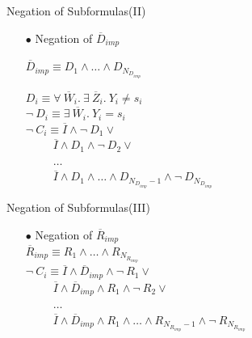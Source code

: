 \documentclass[pdf,slideColor,contemporain]{prosper}
\begin{document}
\begin{slide}{Negation of Subformulas(II)}
     \begin{itemize}
        \item[{\blue$\bullet$}] Negation of $\overline{D}_{imp}$ \\
\vspace{0.2cm}

$\overline{D}_{imp} \equiv D_1
           \wedge \ldots \wedge D_{N_{D_{imp}}}$ \\
\vspace{0.1cm}

$ D_i \equiv
           \forall~ \overline{W}_i. ~ \exists~ \overline{Z}_i. ~ Y_i
           \neq s_i$ \\
\vspace{0.1cm}
$ \neg~ D_i \equiv \exists~
           \overline{W}_i.~ Y_i = s_i$ \\
\vspace{0.3cm}
{\blue
           $ \neg ~ C_i \equiv \overline{I} \wedge \neg~ D_1  \vee$ \\ 
           $~~~~~~~~~~~ \overline{I} \wedge
           D_1 \wedge \neg~ D_2  \vee$ \\ 
           $~~~~~~~~~~~\ldots $ \\ 
           $~~~~~~~~~~~\overline{I} \wedge
           D_1 \wedge \ldots \wedge D_{N_{D_{imp}}-1} \wedge \neg~
           D_{N_{D_{imp}}}$ \\ 
}
     \end{itemize}
\end{slide}

\begin{slide}{Negation of Subformulas(III)}
     \begin{itemize}
        \item[{\blue$\bullet$}] Negation of $\overline{R}_{imp}$ \\
\vspace{0.6cm}
$\overline{R}_{imp} \equiv R_1
           \wedge \ldots \wedge R_{N_{R_{imp}}}$\\

\vspace{0.8cm}
{\blue
           $ \neg ~ C_i  \equiv \overline{I} \wedge \overline{D}_{imp} \wedge \neg~ R_1  \vee$ \\ 
           $~~~~~~~~~~~ \overline{I} \wedge \overline{D}_{imp} \wedge
           R_1 \wedge \neg~ R_2  \vee$ \\ 
           $~~~~~~~~~~~ \ldots $ \\ 
           $~~~~~~~~~~~ \overline{I} \wedge \overline{D}_{imp} \wedge
           R_1 \wedge \ldots \wedge R_{N_{R_{imp}}-1} \wedge \neg~
           R_{N_{R_{imp}}}$ \\ 

}
     \end{itemize}
\end{slide}
\end{document}
